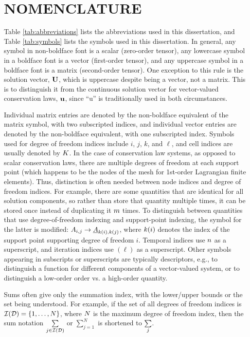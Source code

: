 \chapter*{NOMENCLATURE}

Table \ref{tab:abbreviations} lists the abbreviations used in this dissertation,
and Table \ref{tab:symbols} lists the symbols used in this dissertation.
In general, any symbol in non-boldface font is a scalar (zero-order tensor),
any lowercase symbol in a boldface font is a vector (first-order tensor),
and any uppercase symbol in a boldface font is a matrix (second-order tensor).
One exception to this rule is the solution vector, $\mathbf{U}$, which
is uppercase despite being a vector, not a matrix. This is to distinguish
it from the continuous solution vector for vector-valued conservation laws,
$\mathbf{u}$, since ``u'' is traditionally used in both circumstances.

Individual matrix entries are denoted by the non-boldface equivalent of
the matrix symbol, with two subscripted indices, and individual vector entries
are denoted by the non-boldface equivalent, with one subscripted index.
Symbols used for degree of freedom indices include $i$, $j$, $k$, and $\ell$,
and cell indices are usually denoted by $K$.
In the case of conservation law systems, as opposed to scalar conservation laws,
there are multiple degrees of freedom at each support point (which happens to
be the nodes of the mesh for 1st-order Lagrangian finite elements). Thus, distinction
is often needed between node indices and degree of freedom indices. For example,
there are some quantities that are identical for all solution components,
so rather than store that quantity multiple times, it can be stored once
instead of duplicating it $m$ times. To distinguish between
quantities that use degree-of-freedom indexing and support-point indexing,
the symbol for the latter is modified: $A_{i,j}\rightarrow \underline{A}_{k(i),k(j)}$,
where $k(i)$ denotes the index of the support point supporting
degree of freedom $i$.
Temporal indices
use $n$ as a superscript, and iteration indices use $(\ell)$
as a superscript. Other symbols appearing in subscripts or superscripts
are typically descriptors, e.g., to distinguish a function for different
components of a vector-valued system, or to distinguish a low-order order
vs. a high-order quantity.

Sums often give only the summation index, with the lower/upper bounds or the
set being understood. For example, if the set of all degrees of freedom indices
is $\mathcal{I}(\mathcal{D})=\{1,\ldots,N\}$, where $N$ is the maximum
degree of freedom index, then the sum notation
$\sum\limits_{j\in\mathcal{I}(\mathcal{D})}$ or $\sum\limits_{j=1}^N$ is shortened
to $\sum\limits_j$.

